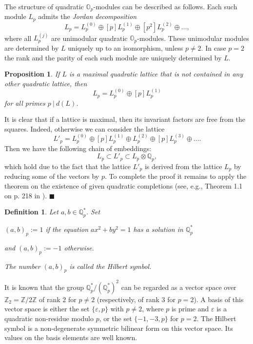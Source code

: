 \documentclass[14pt]{article}
\newtheorem{proposition}{\indent Proposition}[section]
\newtheorem{definition}{\indent Definition}[section]
\newenvironment{proof}                    
       {\par\indent{\bf Proof. }} 
	        {\hfill $\scriptstyle\blacksquare$}
\begin{document}
The structure of quadratic $\mathbb{O}_p$-modules
can be described as follows.
Each such module
$L_p$ admits the \textit{Jordan decomposition}
$$
L_p = L_p^{(0)} \oplus [p] L_p^{(1)} \oplus [p^2] L_p^{(2)} \oplus \ldots,
$$
where all $L_p^{(j)}$ are unimodular quadratic $\mathbb{O}_p$-modules.
These unimodular modules are determined by $L$ uniquely up to an isomorphism, unless
$p \not = 2$. In case $p = 2$ the rank and the parity of each such module are uniquely
determined by $L$.

\begin{proposition}
If $L$ is a maximal quadratic lattice that is not contained
in any other quadratic lattice, then
$$
L_p = L_p^{(0)} \oplus [p] L_p^{(1)}
$$
for all primes $ p \ | \ d(L) $.
\end{proposition}
\begin{proof}
It is clear that if a lattice is maximal, then its invariant factors are
free from
the squares. Indeed, otherwise we can consider the lattice
$$
L'_p = L_p^{(0)} \oplus [p] L_p^{(1)} \oplus L_p^{(2)}
\oplus [p] L_p^{(3)} \oplus
\ldots.
$$
Then we have the following chain of embeddings:
$$
L_p \subset L'_p \subset L_p \otimes \mathbb{Q}_p,
$$
which hold due to the fact that the lattice $L'_p $ is derived from
the lattice $L_p$
by reducing some of the vectors by $p$. To complete the proof
it remains to apply the theorem on the existence of given quadratic
completions (see, e.g., Theorem 1.1 on p. 218 in \cite{kassels82qf}).
\end{proof}


\begin{definition}
Let $a, b \in \mathbb{Q}^*_ p $. Set

$(a, b)_p := 1$ if the equation $ax^2 + by^2 = 1$ has a solution in
$\mathbb{Q}^*_p$

and $(a, b)_p := -1 $ otherwise.

The number $(a, b)_p $ is called the Hilbert symbol.
\end{definition}

It is known that the group $ \mathbb{Q}^*_ p / (\mathbb{Q}^*_ p)^2$ can be
regarded as a vector space over $\mathbb{Z}_2 = \mathbb{Z} / 2 \mathbb{Z}$
of rank $2$  for $p \not = 2$
(respectively, of rank $3$ for $p = 2$). A
basis of this vector space is either
the set $ \{\varepsilon, p \}$ with $ p \not = 2 $, where $p$ is prime and $\varepsilon$ is a
quadratic non-residue modulo $p$, or the set $\{- 1, -3, p \}$ for $p = 2$.
The Hilbert symbol is a non-degenerate symmetric bilinear
form on this vector space. Its values on the basis elements
are well known.
\end{document}

